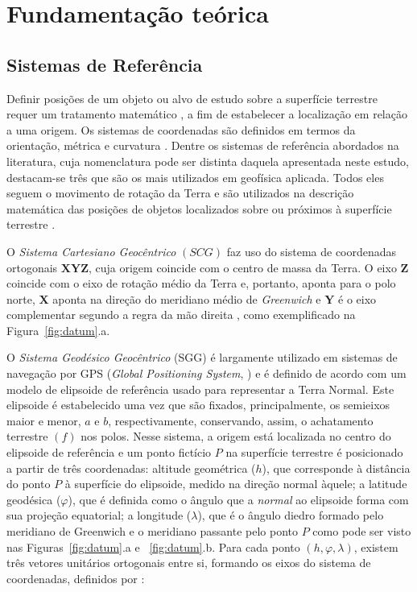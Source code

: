 \chapter{Fundamentação teórica}
\section{Sistemas de Referência}

Definir posições de um objeto ou alvo de estudo sobre a superfície terrestre requer um tratamento matemático \cite{d1999coordenadas}, a fim de estabelecer a localização em relação a uma origem. Os sistemas de coordenadas são definidos em termos da orientação, métrica e curvatura \cite{torge2001geodesy}. Dentre os sistemas de referência abordados na literatura, cuja nomenclatura pode ser distinta daquela apresentada neste estudo, destacam-se três que são os mais utilizados em geofísica aplicada. Todos eles seguem o movimento de rotação da Terra e são utilizados na descrição matemática das posições de objetos localizados sobre ou próximos à superfície terrestre \cite{torge}.

O \textit{Sistema Cartesiano Geocêntrico} $(SCG)$ faz uso do sistema de coordenadas ortogonais $\mathbf{XYZ}$, cuja origem coincide com o centro de massa da Terra. O eixo $\mathbf{Z}$ coincide com o eixo de rotação médio da Terra e, portanto, aponta para o polo norte, $\mathbf{X}$ aponta na direção  do meridiano médio de \textit{Greenwich} e $\mathbf{Y}$ é o eixo complementar segundo a regra da mão direita \cite{soler1976differential,soler1988,torge}, como exemplificado na Figura~\ref{fig:datum}.a.

O \textit{Sistema Geodésico Geocêntrico} (SGG) é largamente utilizado em sistemas de navegação por GPS (\textit{Global Positioning System}, \cite{cai2011}) e é definido de acordo com um modelo de elipsoide de referência usado para representar a Terra Normal. Este elipsoide é estabelecido uma vez que são fixados, principalmente, os semieixos maior e menor, $a$ e $b$, respectivamente, conservando, assim, o achatamento terrestre $(f)$ nos polos. Nesse sistema, a origem está localizada no centro do elipsoide de referência \cite{soler1976differential} e um ponto fictício $P$ na superfície terrestre é posicionado a partir de três coordenadas: altitude geométrica ($h$), que corresponde à distância do ponto $P$ à superfície  do elipsoide, medido na direção normal àquele; a latitude geodésica ($\varphi$), que é definida como o ângulo que a \textit{normal} ao elipsoide  forma com sua projeção equatorial; a longitude ($\lambda$), que é o ângulo diedro formado pelo meridiano de Greenwich e o meridiano passante pelo ponto $P$ como pode ser visto nas Figuras~\ref{fig:datum}.a e ~\ref{fig:datum}.b. Para cada ponto $(h,\varphi,\lambda)$, existem três vetores unitários ortogonais entre si, formando os eixos do sistema de coordenadas, definidos por :

